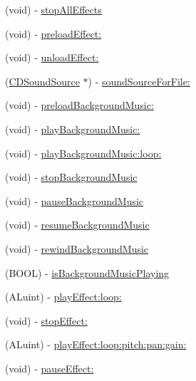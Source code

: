 \begin{DoxyCompactItemize}
\item 
(void) -\/ \hyperlink{interfaceSimpleAudioEngine_a41cac6b6201c29a06ce18e52191520de}{stop\+All\+Effects}
\item 
(void) -\/ \hyperlink{interfaceSimpleAudioEngine_a0f27d03cab04292f2dcbfc1ba8344e54}{preload\+Effect\+:}
\item 
(void) -\/ \hyperlink{interfaceSimpleAudioEngine_a1f3f121b3664c6b5bcfc33c8af63e52c}{unload\+Effect\+:}
\item 
(\hyperlink{interfaceCDSoundSource}{C\+D\+Sound\+Source} $\ast$) -\/ \hyperlink{interfaceSimpleAudioEngine_a8ab8450895ef35d23744db31e5826d01}{sound\+Source\+For\+File\+:}
\item 
(void) -\/ \hyperlink{interfaceSimpleAudioEngine_a289e2e89ab55d63a38792fd8f2e5b645}{preload\+Background\+Music\+:}
\item 
(void) -\/ \hyperlink{interfaceSimpleAudioEngine_ae48157a1dea7e96833cb705bd6cd6709}{play\+Background\+Music\+:}
\item 
(void) -\/ \hyperlink{interfaceSimpleAudioEngine_a57ba0d607696f7d86c66f03c321060ce}{play\+Background\+Music\+:loop\+:}
\item 
(void) -\/ \hyperlink{interfaceSimpleAudioEngine_a81e61f21116fc8d46b8242e9caa48006}{stop\+Background\+Music}
\item 
(void) -\/ \hyperlink{interfaceSimpleAudioEngine_addf0536bfbb9ad38668108ee289ccaf6}{pause\+Background\+Music}
\item 
(void) -\/ \hyperlink{interfaceSimpleAudioEngine_a565f2d3e28072b6a7173064b797767c0}{resume\+Background\+Music}
\item 
(void) -\/ \hyperlink{interfaceSimpleAudioEngine_ab91dfde414f3ef20ccd891e59ba5a67d}{rewind\+Background\+Music}
\item 
(B\+O\+OL) -\/ \hyperlink{interfaceSimpleAudioEngine_a973125b75501bf21ae82f30ab1aea87c}{is\+Background\+Music\+Playing}
\item 
(A\+Luint) -\/ \hyperlink{interfaceSimpleAudioEngine_ac5a5f080f92f05ff681973c3e83c1156}{play\+Effect\+:loop\+:}
\item 
(void) -\/ \hyperlink{interfaceSimpleAudioEngine_a4d818613fe0acb6fa8dc9fac400327f0}{stop\+Effect\+:}
\item 
(A\+Luint) -\/ \hyperlink{interfaceSimpleAudioEngine_ac3e279ef9259ed8c9cb15dc1341c62e6}{play\+Effect\+:loop\+:pitch\+:pan\+:gain\+:}
\item 
(void) -\/ \hyperlink{interfaceSimpleAudioEngine_aa40807db57397fc4dba272439fa017d7}{pause\+Effect\+:}
\item 

\end{DoxyCompactItemize}
